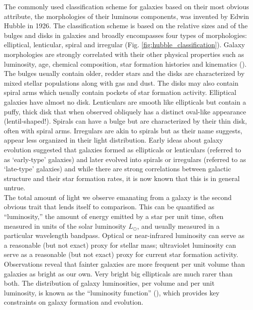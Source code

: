 The commonly used classification scheme for galaxies based on their most obvious attribute, the morphologies of their luminous components, was invented by Edwin Hubble in 1926. The classification scheme is based on the relative sizes and of the bulges and disks in galaxies and broadly encompasses four types of morphologies: elliptical, lenticular, spiral and irregular (Fig. \ref{fig:hubble_classification}). Galaxy morphologies are strongly correlated with their other physical properties such as luminosity, age, chemical composition, star formation histories and kinematics (\citealt{roberts94a}). The bulges usually contain older, redder stars and the disks are characterized by mixed stellar populations along with gas and dust. The disks may also contain spiral arms which usually contain pockets of star formation activity. Elliptical galaxies have almost no disk. Lenticulars are smooth like ellipticals but contain a puffy, thick disk that when observed obliquely has a distinct oval-like appearance (lentil-shaped!). Spirals can have a bulge but are characterized by their thin disk, often with spiral arms. Irregulars are akin to spirals but as their name suggests, appear less organized in their light distribution. Early ideas about galaxy evolution suggested that galaxies formed as ellipticals or lenticulars (referred to as `early-type' galaxies) and later evolved into spirals or irregulars (referred to as `late-type' galaxies) and while there are strong correlations between galactic structure and their star formation rates, it is now known that this is in general untrue.\\

The total amount of light we observe emanating from a galaxy is the
second obvious trait that lends itself to comparison. This can be
quantified as ``luminosity,'' the amount of energy emitted by a star
per unit time, often measured in units of the solar luminosity
$L_{\odot}$, and usually measured in a particular wavelength
bandpass. Optical or near-infrared luminosity can serve as a
reasonable (but not exact) proxy for stellar mass; ultraviolet
luminosity can serve as a reasonable (but not exact) proxy for
current star formation activity. Observations reveal that fainter
galaxies are more frequent per unit volume than galaxies as bright
as our own. Very bright big ellipticals are much rarer than both.
The distribution of galaxy luminosities, per volume and per unit
luminosity, is known as the ``luminosity function''
(\citet{1988MNRAS.232..431E, blanton05a}), which provides key
constraints on galaxy formation and evolution.


